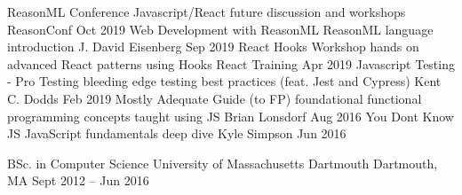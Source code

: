\documentclass[]{awesome-cv}
\begin{document}
\begin{cvhonors}
	\cvhonor
	{ReasonML Conference}
	{Javascript/React future discussion and workshops}
	{ReasonConf}
	{Oct 2019}
	\cvhonor
	{Web Development with ReasonML}
	{ReasonML language introduction}
	{J. David Eisenberg}
	{Sep 2019}
	\cvhonor
	{React Hooks Workshop}
	{hands on advanced React patterns using Hooks}
	{React Training}
	{Apr 2019}
	\cvhonor
	{Javascript Testing - Pro Testing}
	{bleeding edge testing best practices (feat. Jest and Cypress)}
	{Kent C. Dodds}
	{Feb 2019}
	\cvhonor
	{Mostly Adequate Guide (to FP)}
	{foundational functional programming concepts taught using JS}
	{Brian Lonsdorf}
	{Aug 2016}
	\cvhonor
	{You Don\textquotesingle{}t Know JS}
	{JavaScript fundamentals deep dive}
	{Kyle Simpson}
	{Jun 2016}
\end{cvhonors}

\begin{cventries}
	\cventry
	{BSc. in Computer Science}
	{University of Massachusetts Dartmouth}
	{Dartmouth, MA}
	{Sept 2012 – Jun 2016}
	{}
\end{cventries}
\end{document}
